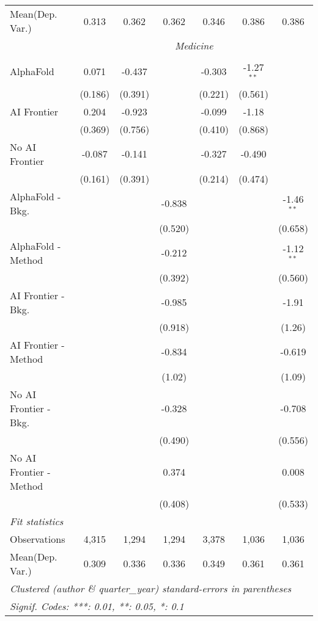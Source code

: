 \begin{tabular}{lcccccc}
Mean(Dep. Var.) & 0.313 & 0.362 & 0.362 & 0.346 & 0.386 & 0.386 \\
 & \multicolumn{6}{c}{\textit{Medicine}} \\ \\
   AlphaFold               & 0.071   & -0.437  &         & -0.303  & -1.27$^{**}$ &   \\   
                           & (0.186) & (0.391) &         & (0.221) & (0.561)      &   \\   
   AI Frontier             & 0.204   & -0.923  &         & -0.099  & -1.18        &   \\   
                           & (0.369) & (0.756) &         & (0.410) & (0.868)      &   \\   
   No AI Frontier          & -0.087  & -0.141  &         & -0.327  & -0.490       &   \\   
                           & (0.161) & (0.391) &         & (0.214) & (0.474)      &   \\   
   AlphaFold - Bkg.        &         &         & -0.838  &         &              & -1.46$^{**}$\\   
                           &         &         & (0.520) &         &              & (0.658)\\   
   AlphaFold - Method      &         &         & -0.212  &         &              & -1.12$^{**}$\\   
                           &         &         & (0.392) &         &              & (0.560)\\   
   AI Frontier - Bkg.      &         &         & -0.985  &         &              & -1.91\\   
                           &         &         & (0.918) &         &              & (1.26)\\   
   AI Frontier - Method    &         &         & -0.834  &         &              & -0.619\\   
                           &         &         & (1.02)  &         &              & (1.09)\\   
   No AI Frontier - Bkg.   &         &         & -0.328  &         &              & -0.708\\   
                           &         &         & (0.490) &         &              & (0.556)\\   
   No AI Frontier - Method &         &         & 0.374   &         &              & 0.008\\   
                           &         &         & (0.408) &         &              & (0.533)\\   
   \midrule
   \emph{Fit statistics}\\
   Observations            & 4,315   & 1,294   & 1,294   & 3,378   & 1,036        & 1,036\\  
Mean(Dep. Var.) & 0.309 & 0.336 & 0.336 & 0.349 & 0.361 & 0.361 \\
   \midrule \midrule
   \multicolumn{7}{l}{\emph{Clustered (author \& quarter\_year) standard-errors in parentheses}}\\
   \multicolumn{7}{l}{\emph{Signif. Codes: ***: 0.01, **: 0.05, *: 0.1}}\\
\end{tabular}
\par\endgroup
